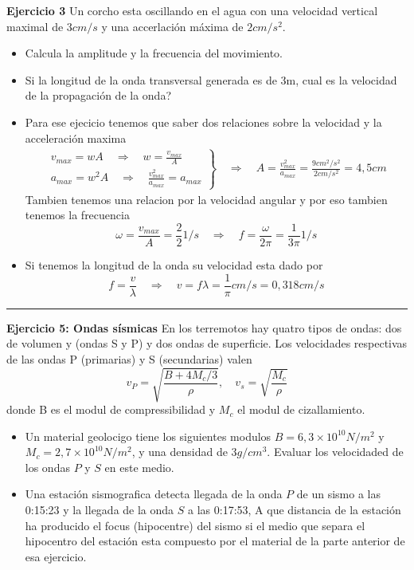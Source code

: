 \begin{ejercicio}
	\textbf{Ejercicio 3} Un corcho esta oscillando en el agua con una velocidad
vertical maximal de $3cm /s$ y una accerlación máxima de $2cm /s^2$. 
	\begin{itemize}
		\item Calcula la amplitude y la frecuencia del movimiento.
		\item Si la longitud de la onda transversal generada es de 3m, cual es
la velocidad de la propagación de la onda?	
	\end{itemize}
\end{ejercicio}
\begin{itemize}
	\item
	Para ese ejecicio tenemos que saber dos relaciones sobre la velocidad y la
acceleración maxima
	\begin{align*}
		\left.
		\begin{aligned}
			v_{max} = w A \quad \Rightarrow \quad w = \frac{v_{max}}{A} \\
			a_{max} = w^2 A  \quad \Rightarrow \quad \frac{v_{max}^2}{a_{max}} =
a_{max}
		\end{aligned}
		\right\rbrace
		\quad \Rightarrow \quad A = \frac{v_{max}^2}{a_{max}} = \frac{9
cm^2/s^2}{2 cm/s^2} = 4,5 cm
	\end{align*}
	Tambien tenemos una relacion por la velocidad angular y por eso tambien
tenemos la frecuencia
	$$
		\omega = \frac{v_{max}}{A} = \frac{2}{2} 1/s \quad \Rightarrow \quad f =
\frac{\omega}{2\pi} = \frac{1}{3 \pi} 1/s
	$$
	
	\item
	Si tenemos la longitud de la onda su velocidad esta dado por
	$$
		f = \frac{v}{\lambda} \quad \Rightarrow \quad v = f \lambda =
\frac{1}{\pi} cm / s = 0,318 cm /s
	$$
\end{itemize}
\rule{\textwidth}{1px}
\begin{ejercicio}
\textbf{Ejercicio 5: Ondas sísmicas} En los terremotos hay quatro tipos de
ondas: dos de volumen y (ondas S y P) y dos ondas de superficie. Los velocidades
respectivas de las ondas P (primarias) y S (secundarias) valen
$$
	v_P = \sqrt{\frac{B+4M_c/3}{\rho}}, \quad v_s = \sqrt{\frac{M_c}{\rho}} 
$$
donde B es el modul de compressibilidad y $M_c$ el modul de cizallamiento.
\begin{itemize}
	\item Un material geolocigo tiene los siguientes modulos $B=6,3\times10^10
N/m^2$ y $M_c = 2,7 \times 10^10 N/m^2$, y una densidad de $3 g/cm^3$. Evaluar
los velocidaded de los ondas $P$ y $S$ en este medio.
	\item Una estación sismografica detecta llegada de la onda $P$ de un sismo a
las 0:15:23 y la llegada de la onda $S$ a las 0:17:53, A que distancia de la
estación ha producido el focus (hipocentre) del sismo si el medio que separa el
hipocentro del estación esta compuesto por el material de la parte anterior de
esa ejercicio.
\end{itemize}
\end{ejercicio}
